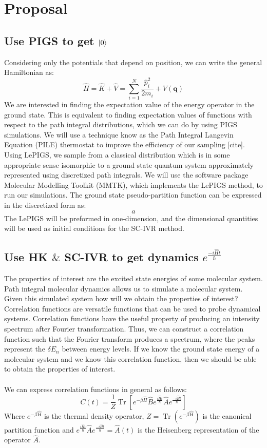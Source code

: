 \documentclass[12pt,letterpaper,oneside,final,titlepage]{article}               %
\numberwithin{equation}{section} %
\newcommand{\eBH}{e^{-\beta\hat{H}}}
\newcommand{\emiHt}{e^{\frac{-i\hat{H}t}{\hbar}}}
\newcommand{\eiHt}{e^{\frac{i\hat{H}t}{\hbar}}}
\renewcommand{\vec}[1]{\mathbf{#1}}
\DeclareMathOperator{\Tr}{Tr}
\begin{document}
\section{Proposal}
\subsection{Use PIGS to get $\ket{0}$}
Considering only the potentials that depend on position, we can write the general Hamiltonian as:
\begin{equation}
    \hat{H} = \hat{K} + \hat{V} = \sum_{i=1}^{N}\frac{\hat{p}_{i}^2}{2m_{i}} + V(\vec{q})
\end{equation}
We are interested in finding the expectation value of the energy operator in the ground state. 
This is equivalent to finding expectation values of functions with respect to the path integral distributions, which we can do by using PIGS simulations.
We will use a technique know as the Path Integral Langevin Equation (PILE) thermostat to improve the efficiency of our sampling [cite].
Using LePIGS, we sample from a classical distribution which is in some appropriate sense isomorphic to a ground state quantum system approximately represented
using discretized path integrals. 
We will use the software package Molecular Modelling Toolkit (MMTK), which implements the LePIGS method, to run our simulations.
The ground state pseudo-partition function can be expressed in the discretized form as:
\begin{equation}
    a
\end{equation}
The LePIGS will be preformed in one-dimension, and the dimensional quantities will be used as initial conditions for the SC-IVR method.


\subsection{Use HK $\&$ SC-IVR to get dynamics $\emiHt$} 
The properties of interest are the excited state energies of some molecular system. 
Path integral molecular dynamics allows us to simulate a molecular system. 
Given this simulated system how will we obtain the properties of interest?
Correlation functions are versatile functions that can be used to probe dynamical systems.
Correlation functions have the useful property of producing an intensity spectrum after Fourier transformation.
Thus, we can construct a correlation function such that the Fourier transform produces a spectrum, where the peaks
represent the $\delta E_{n}$ between energy levels.
If we know the ground state energy of a molecular system and we know this correlation function, then we should be able to obtain the properties of interest. \\ \\
We can express correlation functions in general as follows:
\begin{equation}
    C(t) = \frac{1}{Z}\Tr[\eBH\hat{B}\eiHt\hat{A}\emiHt]
\end{equation}
Where $\eBH$ is the thermal density operator, $Z = \Tr(\eBH)$ is the canonical partition function 
and $\eiHt\hat{A}\emiHt=\hat{A}(t)$ is the Heisenberg representation of the operator $\hat{A}$.
\end{document}
